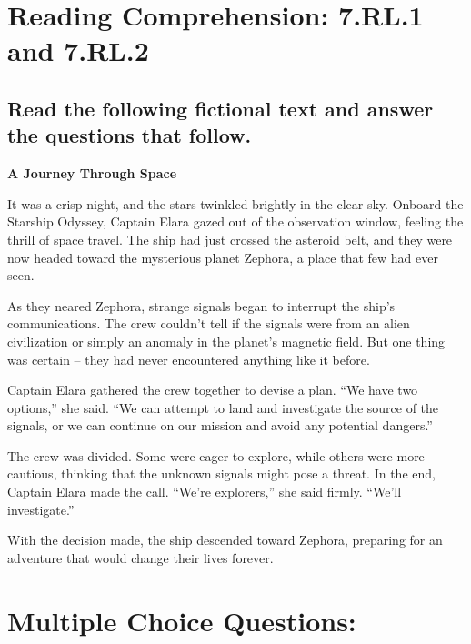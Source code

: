 \documentclass[12pt]{article}
\begin{document}
\onehalfspacing

\section*{Reading Comprehension: 7.RL.1 and 7.RL.2}

\subsection*{Read the following fictional text and answer the questions that follow.}

\begin{flushleft}
\textbf{A Journey Through Space}
\end{flushleft}

It was a crisp night, and the stars twinkled brightly in the clear sky. Onboard the Starship Odyssey, Captain Elara gazed out of the observation window, feeling the thrill of space travel. The ship had just crossed the asteroid belt, and they were now headed toward the mysterious planet Zephora, a place that few had ever seen.

As they neared Zephora, strange signals began to interrupt the ship’s communications. The crew couldn’t tell if the signals were from an alien civilization or simply an anomaly in the planet’s magnetic field. But one thing was certain – they had never encountered anything like it before.

Captain Elara gathered the crew together to devise a plan. “We have two options,” she said. “We can attempt to land and investigate the source of the signals, or we can continue on our mission and avoid any potential dangers.”

The crew was divided. Some were eager to explore, while others were more cautious, thinking that the unknown signals might pose a threat. In the end, Captain Elara made the call. “We’re explorers,” she said firmly. “We’ll investigate.”

With the decision made, the ship descended toward Zephora, preparing for an adventure that would change their lives forever.

\newpage

\section*{Multiple Choice Questions:}
\end{document}
